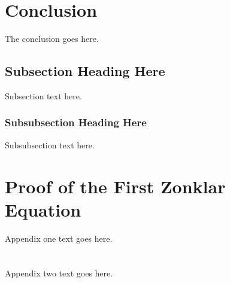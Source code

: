 \documentclass[journal]{IEEEtran}
\begin{document}
\section{Conclusion} 
The conclusion goes here. 
\subsection{Subsection Heading Here} 
Subsection text here. 
\subsubsection{Subsubsection Heading Here} 
Subsubsection text here. 
\appendices 
\section{Proof of the First Zonklar Equation} 
Appendix one text goes here. 
\section{} 
Appendix two text goes here. 
\end{document}
